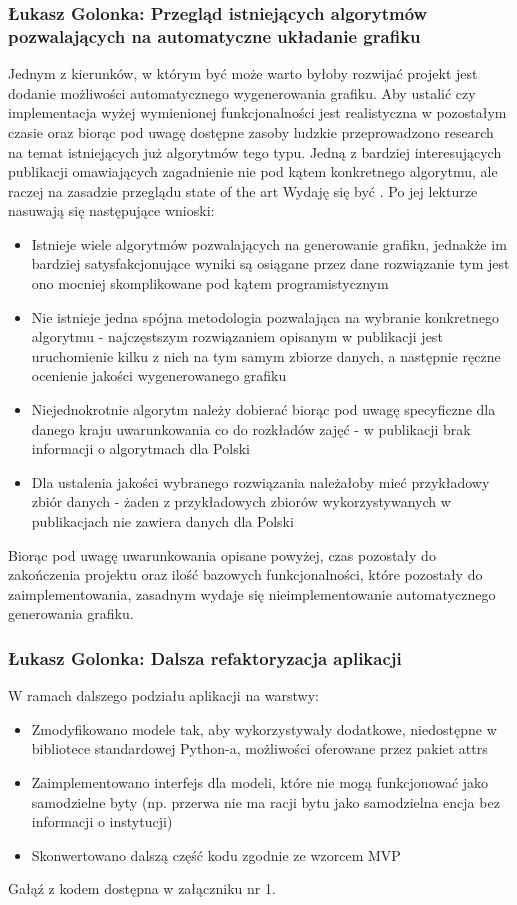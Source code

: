 \documentclass[12pt,a4paper,oneside]{article}
\theoremstyle{definition}
\numberwithin{equation}{section}
\begin{document}
\subsubsection{Łukasz Golonka: Przegląd istniejących algorytmów pozwalających na automatyczne układanie grafiku}
Jednym z kierunków, w którym być może warto byłoby rozwijać projekt jest dodanie możliwości automatycznego wygenerowania grafiku.
Aby ustalić czy implementacja wyżej wymienionej funkcjonalności jest realistyczna w pozostałym czasie oraz biorąc pod uwagę dostępne zasoby ludzkie przeprowadzono research na temat istniejących już algorytmów tego typu.
Jedną z bardziej interesujących publikacji omawiających zagadnienie nie pod kątem konkretnego algorytmu, ale raczej na zasadzie przeglądu state of the art Wydaję się być \cite{auto_time_tables}.
Po jej lekturze nasuwają się następujące wnioski:
\begin{itemize}
	\item Istnieje wiele algorytmów pozwalających na generowanie grafiku, jednakże im bardziej satysfakcjonujące wyniki są osiągane przez dane rozwiązanie tym jest ono mocniej skomplikowane pod kątem programistycznym
	\item Nie istnieje jedna spójna metodologia pozwalająca na wybranie konkretnego algorytmu - najczęstszym rozwiązaniem opisanym w publikacji jest uruchomienie kilku z nich na tym samym zbiorze danych, a następnie ręczne ocenienie jakości wygenerowanego grafiku
	\item Niejednokrotnie algorytm należy dobierać biorąc pod uwagę specyficzne dla danego kraju uwarunkowania co do rozkładów zajęć - w publikacji brak informacji o algorytmach dla Polski
	\item Dla ustalenia jakości wybranego rozwiązania należałoby mieć przykładowy zbiór danych - żaden z przykładowych zbiorów wykorzystywanych w publikacjach nie zawiera danych dla Polski
\end{itemize}
Biorąc pod uwagę uwarunkowania opisane powyżej, czas pozostały do zakończenia projektu oraz ilość bazowych funkcjonalności, które pozostały do zaimplementowania, zasadnym wydaje się nieimplementowanie automatycznego generowania grafiku.

\subsubsection{Łukasz Golonka: Dalsza refaktoryzacja aplikacji}
W ramach dalszego podziału aplikacji na warstwy:
\begin{itemize}
	\item Zmodyfikowano modele tak, aby wykorzystywały dodatkowe, niedostępne w bibliotece standardowej Python-a, możliwości oferowane przez pakiet attrs \cite{attrs}
	\item Zaimplementowano interfejs dla modeli, które nie mogą funkcjonować jako samodzielne byty (np. przerwa nie ma racji bytu jako samodzielna encja bez informacji o instytucji)
	\item Skonwertowano dalszą część kodu zgodnie ze wzorcem MVP
\end{itemize}
Gałąź z kodem dostępna w załączniku nr 1.
\end{document}
